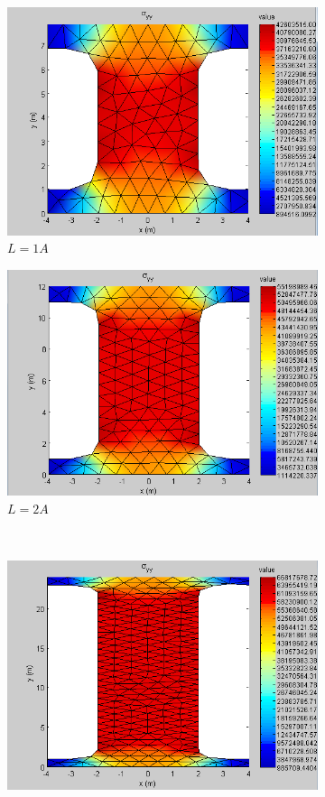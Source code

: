 \documentclass[paper=letter, fontsize=11pt]{scrartcl} %
\numberwithin{equation}{section} %
\numberwithin{figure}{section} %
\numberwithin{table}{section} %
\begin{document}
\begin{figure}[h]
\begin{subfigure}[b]{0.45\textwidth}
		\includegraphics[width=\textwidth]{stress1.png}
		\caption{$L = 1 A$}
	\end{subfigure}
	\hfill
	\begin{subfigure}[b]{0.45\textwidth}
		\includegraphics[width=\textwidth]{stress2.png}
		\caption{$L = 2 A$}
	\end{subfigure}
	\\
	\begin{subfigure}[b]{0.45\textwidth}
		\includegraphics[width=\textwidth]{stress5.png}

\end{subfigure}
\end{figure}
\end{document}
